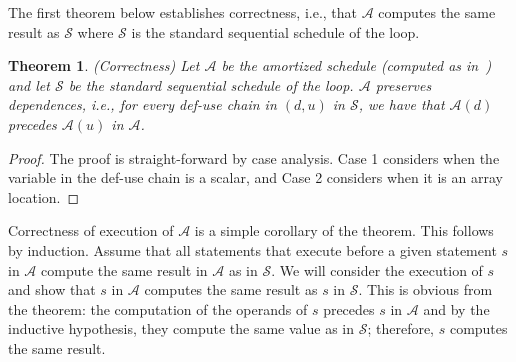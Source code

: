 \documentclass[sigconf, screen, natbib=false, dvipsnames, table]{acmart}
\newtheorem{theorem}{Theorem}
\theoremstyle{definition}
\begin{document}
The first theorem below establishes correctness, i.e., that $\mathcal{A}$ computes the same result as $\mathcal{S}$ where
$\mathcal{S}$ is the standard sequential schedule of the loop. 

\begin{theorem}(Correctness)
Let $\mathcal{A}$ be the amortized schedule (computed as in~) and let $\mathcal{S}$ be the standard sequential 
schedule of the loop. $\mathcal{A}$ preserves dependences, i.e., for every def-use chain in $(d,u)$ in $\mathcal{S}$, we have that
$\mathcal{A}(d)$ precedes $\mathcal{A}(u)$ in $\mathcal{A}$.
\end{theorem}

\begin{proof}
The proof is straight-forward by case analysis. Case 1 considers when the variable in the def-use chain is a scalar, and Case 2 considers when 
it is an array location. 
\end{proof}

Correctness of execution of $\mathcal{A}$ is a simple corollary of the theorem. This follows by induction. Assume that all statements that 
execute before a given statement $s$ in $\mathcal{A}$ compute the same result in $\mathcal{A}$ as in $\mathcal{S}$. We will consider 
the execution of $s$ and show that $s$ in $\mathcal{A}$ computes the same result as $s$ in $\mathcal{S}$. This is obvious from the 
theorem: the computation of the operands of $s$ precedes $s$ in $\mathcal{A}$ and by the inductive hypothesis, they compute the
same value as in $\mathcal{S}$; therefore, $s$ computes the same result.





\end{document}
